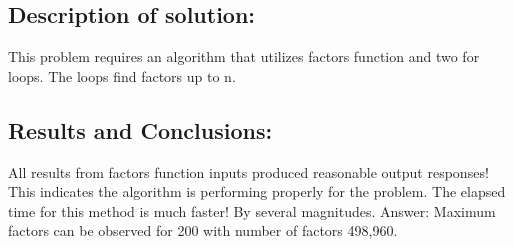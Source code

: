 \documentclass[12pt]{article} %
\begin{document}







\subsection{Description of solution:}
This problem requires an algorithm that utilizes factors  function and two for loops.  The loops find factors up to n.

\subsection{Results and Conclusions:}
All results from factors function inputs produced reasonable output responses! This indicates the algorithm is performing properly for the problem.  
The elapsed time for this method is much faster! By several magnitudes. Answer: Maximum factors can be observed for 200 with number of factors 498,960.
\end{document}
